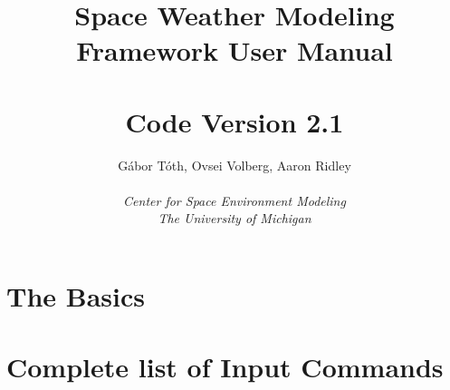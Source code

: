 \documentclass[twoside,10pt]{book}
\title{Space Weather Modeling Framework User Manual \\ 
       \hfill \\
       \large Code Version 2.1}
\author{G\'abor T\'oth, Ovsei Volberg, Aaron Ridley\\
       \hfill \\
       {\it Center for Space Environment Modeling}\\
       {\it The University of Michigan}}
\begin{document}
\pagestyle{fancy}
\lhead[\fancyplain{}{\bfseries\thepage}]{\fancyplain{}{\bfseries\rightmark}}
\rhead[\fancyplain{}{\bfseries\leftmark}]{\fancyplain{}{\bfseries\thepage}}
\cfoot{}

\maketitle

\tableofcontents



\chapter{The Basics}





\chapter{Complete list of Input Commands}








\end{document}
